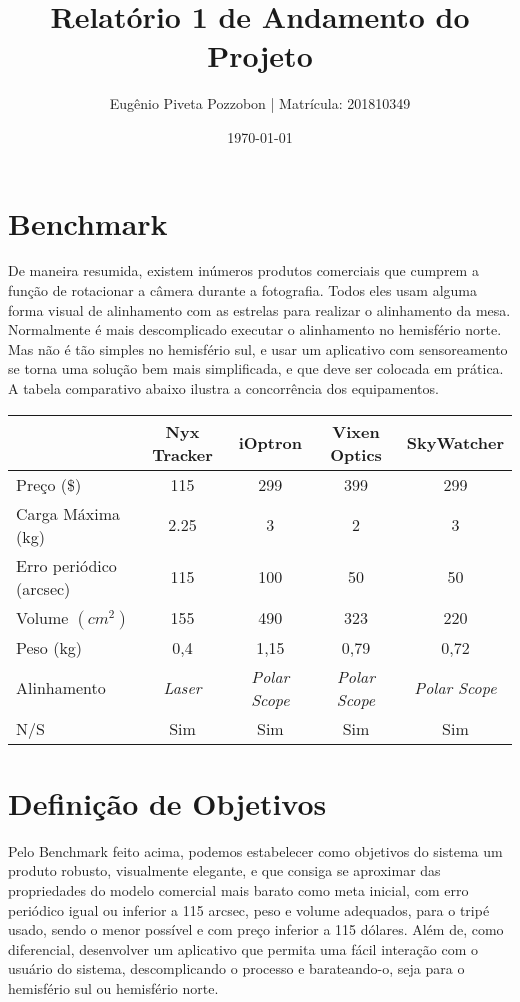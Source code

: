 \documentclass[a4paper, 12pt]{article}
\title{Relatório 1 de Andamento do Projeto}
\author{Eugênio Piveta Pozzobon | Matrícula: 201810349}
\date{\today}
\begin{document}
\maketitle
\newpage
\tableofcontents
\newpage
\section{Benchmark}

De maneira resumida, existem inúmeros produtos comerciais que cumprem a função de rotacionar a câmera durante a fotografia. Todos eles usam alguma forma visual de alinhamento com as estrelas para realizar o alinhamento da mesa. Normalmente é mais descomplicado executar o alinhamento no hemisfério norte. Mas não é tão simples no hemisfério sul, e usar um aplicativo com sensoreamento se torna uma solução bem mais simplificada, e que deve ser colocada em prática. A tabela comparativo abaixo ilustra a concorrência dos equipamentos. 

\begin{table}[htb]
	\begin{tabular}{l|cccc}
	 & Nyx Tracker & iOptron & Vixen Optics & SkyWatcher \\ \hline
	Preço (\$) & 115 & 299 & 399 & 299 \\\hline
	Carga Máxima (kg) & 2.25 & 3 & 2 & 3 \\\hline
	Erro periódico (arcsec) & 115 & 100 & 50 & 50 \\\hline
	Volume $ (cm^2) $ & 155 & 490 & 323 & 220 \\\hline
	Peso (kg) & 0,4 & 1,15 & 0,79 & 0,72 \\\hline
	Alinhamento & \textit{Laser} & \textit{Polar Scope} & \textit{Polar Scope} & \textit{Polar Scope} \\\hline
	N/S & Sim & Sim & Sim & Sim \\
\end{tabular}
\end{table}

\section{Definição de Objetivos}
Pelo Benchmark feito acima, podemos estabelecer como objetivos do sistema um produto robusto, visualmente elegante, e que consiga se aproximar das propriedades do modelo comercial mais barato como meta inicial, com erro periódico igual ou inferior a 115 arcsec, peso e volume adequados, para o tripé usado, sendo o menor possível e com preço inferior a 115 dólares. Além de, como diferencial, desenvolver um aplicativo que permita uma fácil interação com o usuário do sistema, descomplicando o processo e barateando-o, seja para o hemisfério sul ou hemisfério norte.
\end{document}

